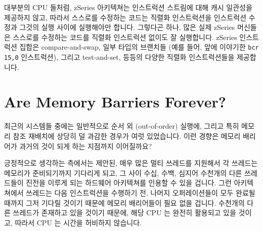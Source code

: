 대부분의 CPU 들처럼, zSeries 아키텍쳐는 인스트럭션 스트림에 대해 캐시 일관성을
제공하지 않고, 따라서 스스로를 수정하는 코드는 직렬화 인스트럭션을 인스트럭션
수정과 그것의 실행 사이에 실행해야만 합니다.
그렇다곤 하나, 많은 실제 zSeries 머신들은 스스로를 수정하는 코드를 직렬화
인스트럭션 없이도 잘 실행합니다.
zSeries 인스트럭션 집합은 compare-and-swap, 일부 타입의 브랜치들 (예를 들어,
앞에 이야기한 {\tt bcr 15,0} 인스트럭션), 그리고 test-and-set, 등등의 다양한
직렬화 인스트럭션들을 제공합니다.

\section{Are Memory Barriers Forever?}
\label{sec:app:whymb:Are Memory Barriers Forever?}

최근의 시스템들 중에는 일반적으로 순서 외 (out-of-order) 실행에, 그리고 특히
메모리 참조 재배치에 상당히 덜 과감한 경우가 여럿 있었습니다.
이런 경향은 메모리 배리어가 과거의 것이 되게 하는 지점까지 이어질까요?

긍정적으로 생각하는 측에서는 제안된, 매우 많은 멀티 쓰레드를 지원해서 각
쓰레드는 메모리가 준비되기까지 기다리게 되고, 그 사이 수십, 수백, 심지어
수천개의 다른 쓰레드들이 진전을 이루게 되는 하드웨어 아키텍쳐를 인용할 수 있을
겁니다.
그런 아키텍쳐에서 쓰레드는 다음 인스트럭션을 수행하기 전, 나머지 오퍼레이션들이
모두 완료될 때까지 그저 기다릴 것이기 때문에 메모리 배리어들이 필요 없을
겁니다.
수천개의 다른 쓰레드가 존재하고 있을 것이기 때문에, 해당 CPU 는 완전히 활용되고
있을 것이고, 따라서 CPU 는 시간을 허비하지 않습니다.

